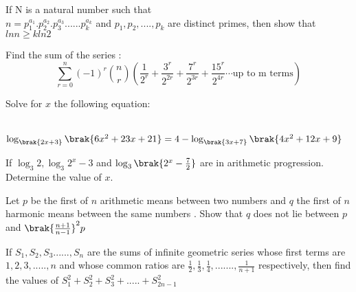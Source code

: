 \iffalse
  \title{Assignment-1}
  \author{EE24BTECH11016 - DHWANITH M DODDAHUNDI}
  \section{subjective}
\fi
    \item If N is a natural number such that
\\ 
$n= p_{1}^{a_1}.p_{2}^{a_2}.p_{3}^{a_3}......p_{k}^{a_k} $ and $ p_{1},p_{2},....,p_{k} $ are distinct primes, then show that $ ln n \geq k ln2 $                              
     
		\hfill {}              


	\item Find the sum of the series :\[
\sum_{r=0}^{n} (-1)^r \binom{n}{r} \left( \frac{1}{2^r} + \frac{3^r}{2^{2r}} + \frac{7^r}{2^{3r}} + \frac{15^r}{2^{4r}}  \cdots \text{up to m terms} \right)
\]



	    
	    
	    \hfill {}
	    
     \item Solve for $x$ the following equation:     
     
	     \hfill {}          \\              
		     $   \log_{\brak{2x+3}}{\brak{6x^{2}+23x+21}}=4-\log_{\brak{3x+7}}{\brak{4x^{2}+12x+9}} $

	     \item If $ \log_{3}{2},\log_{3}{2^{x}-3} $ and $ \log_{3}{\brak{2^{x}-\frac{7}{2}}} $ are in arithmetic progression. Determine the value of $x$.  
     
	      \hfill {}
      

      \item Let $p$ be the first of $n$ arithmetic means between two numbers and $q$ the first of $n$ harmonic means between the same numbers . Show that $q$ does not lie between $p$ and $\brak{\frac{n+1}{n-1}}^{2}p$ 
       
	      \hfill {}
      

      \item  If $ S_1,S_2,S_3......,S_n $ are the sums of infinite geometric series whose first terms are $1,2,3,.....,n$ and whose common ratios are $ \frac{1}{2},\frac{1}{3},\frac{1}{4},.......,\frac{1}{n+1} $ respectively, then find the values of $ S_{1}^{2}+S_{2}^{2}+S_{3}^{2}+.....+S_{2n-1}^{2} $
      
